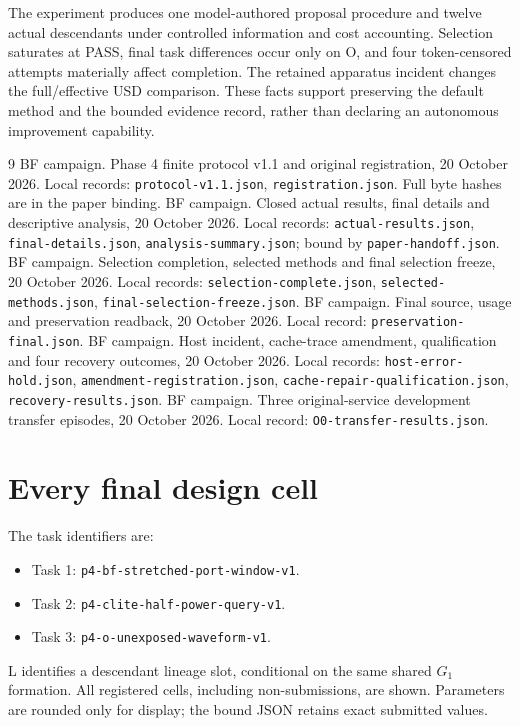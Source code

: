 The experiment produces one model-authored proposal procedure and twelve
actual descendants under controlled information and cost accounting.
Selection saturates at PASS, final task differences occur only on O, and
four token-censored attempts materially affect completion. The retained
apparatus incident changes the full/effective USD comparison. These facts
support preserving the default method and the bounded evidence record,
rather than declaring an autonomous improvement capability.

\renewcommand{\refname}{Local sealed source records}
\begin{thebibliography}{9}
 BF campaign. Phase 4 finite protocol v1.1 and original
registration, 20 October 2026. Local records: \nolinkurl{protocol-v1.1.json},
\nolinkurl{registration.json}. Full byte hashes are in the paper binding.
 BF campaign. Closed actual results, final details and
descriptive analysis, 20 October 2026. Local records:
\nolinkurl{actual-results.json}, \nolinkurl{final-details.json},
\nolinkurl{analysis-summary.json}; bound by \nolinkurl{paper-handoff.json}.
 BF campaign. Selection completion, selected methods and
final selection freeze, 20 October 2026. Local records:
\nolinkurl{selection-complete.json}, \nolinkurl{selected-methods.json},
\nolinkurl{final-selection-freeze.json}.
 BF campaign. Final source, usage and preservation
readback, 20 October 2026. Local record: \nolinkurl{preservation-final.json}.
 BF campaign. Host incident, cache-trace amendment,
qualification and four recovery outcomes, 20 October 2026. Local records:
\nolinkurl{host-error-hold.json}, \nolinkurl{amendment-registration.json},
\nolinkurl{cache-repair-qualification.json}, \nolinkurl{recovery-results.json}.
 BF campaign. Three original-service development transfer
episodes, 20 October 2026. Local record: \nolinkurl{O0-transfer-results.json}.
\end{thebibliography}

\clearpage
\appendix
\section{Every final design cell}\label{app:cells}

The task identifiers are:
\begin{itemize}
\item Task 1: \nolinkurl{p4-bf-stretched-port-window-v1}.
\item Task 2: \nolinkurl{p4-clite-half-power-query-v1}.
\item Task 3: \nolinkurl{p4-o-unexposed-waveform-v1}.
\end{itemize}
L identifies a descendant lineage slot,
conditional on the same shared $G_1$ formation. All registered cells, including
non-submissions, are shown. Parameters are rounded only for display; the
bound JSON retains exact submitted values.

